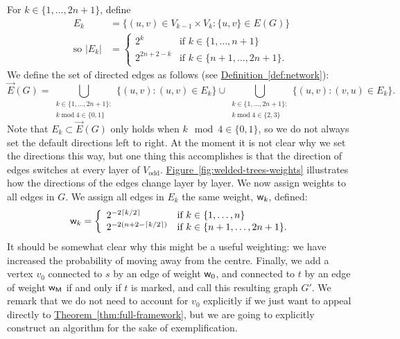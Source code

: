 \documentclass{theoretics}
\newcommand{\thm}[1]{\hyperref[thm:#1]{Theorem~\ref*{thm:#1}}}
\newcommand{\defin}[1]{\hyperref[def:#1]{Definition~\ref*{def:#1}}}
\newcommand{\fig}[1]{\hyperref[fig:#1]{Figure~\ref*{fig:#1}}}
\renewcommand{\>}{\rangle}
\newcommand{\<}{\langle}
\renewcommand{\(}{\left(}
\renewcommand{\)}{\right)}
\def\w{{\sf w}}
\begin{document}
For $k\in \{1,\dots,2n+1\}$, define
\begin{equation}
\begin{split}
E_k&=\{(u,v)\in V_{k-1}\times V_k: \{u,v\}\in E(G)\}\\
\mbox{so }|E_k| &= \left\{\begin{array}{ll}
2^k & \mbox{if }k\in\{1,\dots,n+1\}\\
2^{2n+2-k} &\mbox{if }k\in\{n+1,\dots,2n+1\}.
\end{array}\right.
\end{split}\label{eq:welded-E_k}
\end{equation}
We define the set of directed edges as follows (see \defin{network}):
\begin{equation} 
\overrightarrow{E}(G)=\bigcup_{\substack{k\in\{1,\dots,2n+1\}:\\k\;\mathrm{mod}\; 4\in \{0,1\}}}\{(u,v):(u,v)\in E_k\}
\cup \bigcup_{\substack{k\in\{1,\dots,2n+1\}:\\k\;\mathrm{mod}\; 4\in \{2,3\}}}\{(u,v):(v,u)\in E_k\}.\label{eq:welded-EG}
\end{equation}
Note that $E_k\subset \overrightarrow{E}(G)$ only holds when $k\mod 4 \in \{0,1\}$, so we do not always set the default directions left to right. 
At the moment it is not clear why we set the directions this way, but one thing this accomplishes is that the direction of edges switches at every layer of $V_{\mathrm{odd}}$. \fig{welded-trees-weights} illustrates how the directions of the edges change layer by layer. 
We now assign weights to all edges in $G$. We assign all edges in $E_k$ the same weight, $\w_k$, defined:
\begin{equation}
\w_k=\left\{\begin{array}{ll}
2^{-2\lceil k/2\rceil} & \mbox{if }k\in\{1,\dots,n\}\\
2^{-2(n+2-\lceil k/2\rceil)} & \mbox{if }k\in\{n+1,\dots,2n+1\}.
\end{array}\right.\label{eq:welded-w_k}
\end{equation}
It should be somewhat clear why this might be a useful weighting: we have increased the probability of moving away from the centre. Finally, we add a vertex $v_0$ connected to $s$ by an edge of weight $\w_0$, and connected to $t$ by an edge of weight $\w_{\sf M}$ if and only if $t$ is marked, and call this resulting graph $G'$. We remark that we do not need to account for $v_0$ explicitly if we just want to appeal directly to \thm{full-framework}, but we are going to explicitly construct an algorithm for the sake of exemplification. 
\end{document}

